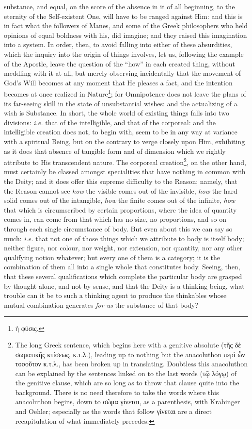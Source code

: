 substance, and equal, on the score of the absence in it of all beginning, to the eternity of the Self-existent One, will have to be ranged against Him: and this is in fact what the followers of Manes, and some of the Greek philosophers who held opinions of equal boldness with his, did imagine; and they raised this imagination into a system. In order, then, to avoid falling into either of these absurdities, which the inquiry into the origin of things involves, let us, following the example of the Apostle, leave the question of the “how” in each created thing, without meddling with it at all, but merely observing incidentally that the movement of God’s Will becomes at any moment that He pleases a fact, and the intention becomes at once realized in Nature\footnote{\textgreek{ἡ φύσις}.}; for Omnipotence does not leave the plans of its far-seeing skill in the state of unsubstantial wishes: and the actualizing of a wish is Substance. In short, the whole world of existing things falls into two divisions: \emph{i.e.} that of the intelligible, and that of the corporeal: and the intelligible creation does not, to begin with, seem to be in any way at variance with a spiritual Being, but on the contrary to verge closely upon Him, exhibiting as it does that absence of tangible form and of dimension which we rightly attribute to His transcendent nature. The corporeal creation\footnote{The long Greek sentence, which begins here with a genitive absolute (\textgreek{τῆς δὲ σωματικῆς κτίσεως, κ.τ.λ}.), leading up to nothing but the anacoluthon \textgreek{περὶ ὧν τοσοῦτον κ.τ.λ}., has been broken up in translating. Doubtless this anacoluthon can be explained by the sentences linked on to the last words (\textgreek{τῷ λόγῳ}) of the genitive clause, which are so long as to throw that clause quite into the background. There is no need therefore to take the words where this anacoluthon begins, down to \textgreek{σῶμα γίνεται}, as a parenthesis, with Krabinger and Oehler; especially as the words that follow \textgreek{γίνεται} are a direct recapitulation of what immediately precedes.}, on the other hand, must certainly be classed amongst specialities that have nothing in common with the Deity; and it does offer this supreme difficulty to the Reason; namely, that the Reason cannot see \emph{how} the visible comes out of the invisible, \emph{how} the hard solid comes out of the intangible, \emph{how} the finite comes out of the infinite, \emph{how} that which is circumscribed by certain proportions, where the idea of quantity comes in, can come from that which has no size, no proportions, and so on through each single circumstance of body. But even about this we can say so much: \emph{i.e.} that not one of those things which we attribute to body is itself body; neither figure, nor colour, nor weight, nor extension, nor quantity, nor any other qualifying notion whatever; but every one of them is a category; it is the combination of them all into a single whole that constitutes body. Seeing, then, that these several qualifications which complete the particular body are grasped by thought alone, and not by sense, and that the Deity is a thinking being, what trouble can it be to such a thinking agent to produce the thinkables whose mutual combination generates \emph{for us} the substance of that body? 